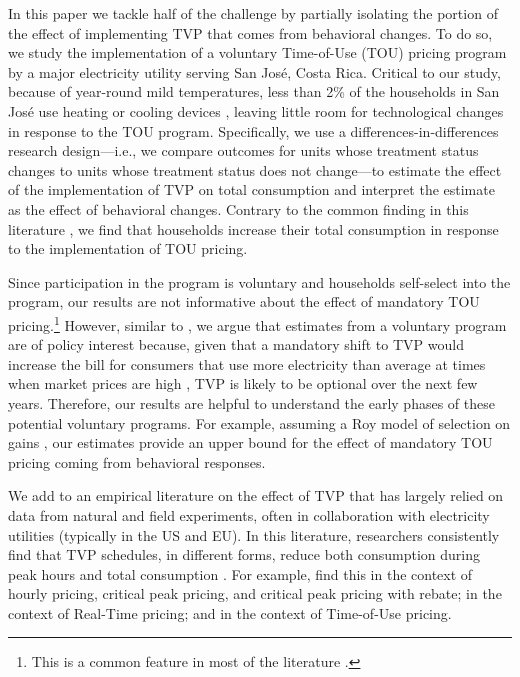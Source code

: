 \documentclass[12pt]{article}
\begin{document}
In this paper we tackle half of the challenge by partially isolating the portion of the effect of implementing TVP that comes from behavioral changes. To do so, we study the implementation of a voluntary Time-of-Use (TOU) pricing program by a major electricity utility serving San José, Costa Rica. Critical to our study, because of year-round mild temperatures, less than 2\% of the households in San José use heating or cooling devices \citep{ministeriodeambienteyenergiaEstudioParaCaracterizacion2019}, leaving little room for technological changes in response to the TOU program. Specifically, we use a differences-in-differences research design---i.e., we compare outcomes for units whose treatment status changes to units whose treatment status does not change---to estimate the effect of the implementation of TVP on total consumption and interpret the estimate as the effect of behavioral changes. Contrary to the common finding in this literature \citep{faruquiHouseholdResponseDynamic2010,minabadtke-berkowPrimerTimevariantElectricity2015,duttaLiteratureReviewDynamic2017}, we find that households increase their total consumption in response to the implementation of TOU pricing.

Since participation in the program is voluntary and households self-select into the program, our results are not informative about the effect of mandatory TOU pricing.\footnote{This is a common feature in most of the literature \citep{faruquiHouseholdResponseDynamic2010,minabadtke-berkowPrimerTimevariantElectricity2015}.} However, similar to \citet{allcottRethinkingRealtimeElectricity2011}, we argue that estimates from a voluntary program are of policy interest because, given that a mandatory shift to TVP would increase the bill for consumers that use more electricity than average at times when market prices are high \citep{borensteinWealthTransfersLarge2007}, TVP is likely to be optional over the next few years. Therefore, our results are helpful to understand the early phases of these potential voluntary programs. For example, assuming a Roy model of selection on gains \citep{heckmanChapter70Econometric2007}, our estimates provide an upper bound for the effect of mandatory TOU pricing coming from behavioral responses.

We add to an empirical literature on the effect of TVP that has largely relied on data from natural and field experiments, often in collaboration with electricity utilities (typically in the US and EU). In this literature, researchers consistently find that TVP schedules, in different forms, reduce both consumption during peak hours and total consumption \citep{faruquiHouseholdResponseDynamic2010,minabadtke-berkowPrimerTimevariantElectricity2015}. For example, \citet{wolakResidentialCustomersRespond2011} find this in the context of hourly pricing, critical peak pricing, and critical peak pricing with rebate; \citet{allcottRethinkingRealtimeElectricity2011} in the context of Real-Time pricing; and \citet{jessoeUnderstandingRolePrice2014} in the context of Time-of-Use pricing.
\end{document}
